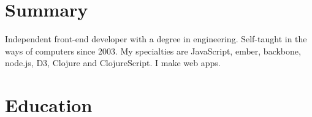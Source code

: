 \documentclass[letterpaper]{deedy-resume} %
\begin{document}
%
%
%
%
%
%
%
%
%
%


\section{Summary}
\flushleft\location{} %

Independent front-end developer with a degree in engineering. Self-taught
in the ways of computers since 2003. My specialties are JavaScript,
ember, backbone, node.js, D3, Clojure and ClojureScript. I make web apps.


\sectionspace %


\section{Education}
\end{document}
